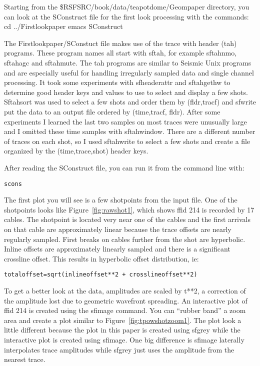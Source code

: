 Starting from the \$RSFSRC/book/data/teapotdome/Geompaper directory, you can look at the SConstruct file for the first look processing with the commands:
cd ../Firstlookpaper
emacs SConstruct

The Firstlookpaper/SConstuct file makes use of the trace with header (tah) programs.  These program names all start with sftah, for example sftahnmo, sftahagc and sftahmute.  The tah programs are similar to Seismic Unix programs and are especially useful for handling irregularly sampled data and single channel processing.   It took some experiments with sfheaderattr and sftahgethw to determine good header keys and values to use to select and display a few shots.  Sftahsort was used to select a few shots and order them by (fldr,tracf) and sfwrite put the data to an output file ordered by (time,tracf, fldr).  After some experiments I learned the last two samples on most traces were unusually large and I omitted these time samples with sftahwindow.   There are a different number of traces on each shot, so I used sftahwrite to select a few shots and create a file organized by the (time,trace,shot) header keys. 

After reading the SConstruct file, you can run it from the command line with:
\begin{verbatim}   
scons
\end{verbatim}   

The first plot you will see is a few shotpoints from the input file.  One of the shotpoints looks like Figure~\ref{fig:rawshot1}, which shows ffid 214 is recorded by 17 cables.  The shotpoint is located very near one of the cables and the first arrivals on that cable are approximately linear because the trace offsets are nearly regularly sampled.  First breaks on cables further from the shot are hyperbolic.   Inline offsets are approximately linearly sampled and there is a significant crossline offset.  This results in hyperbolic offset distribution, ie:
\begin{verbatim}   
totaloffset=sqrt(inlineoffset**2 + crosslineoffset**2) 
\end{verbatim}   

To get a better look at the data, amplitudes are scaled by t**2, a correction of the amplitude lost due to geometric wavefront spreading.  An interactive plot of ffid 214 is created using the sfimage command.  You can “rubber band” a zoom area and create a plot similar to Figure~\ref{fig:tpowshotzoom1}.   The plot look a little different because the plot in this paper is created using sfgrey while the interactive plot is created using sfimage.  One big difference is sfimage laterally interpolates trace amplitudes while sfgrey just uses the amplitude from the nearest trace.

